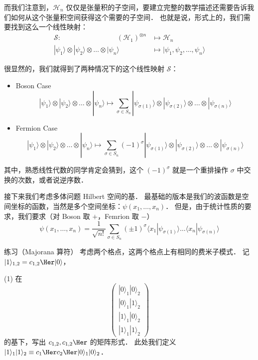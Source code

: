 而我们注意到，$\mathcal{H}_n$ 仅仅是张量积的子空间，要建立完整的数学描述还需要告诉我们如何从这个张量积空间获得这个需要的子空间． 也就是说，形式上的，我们需要找到这么一个线性映射：
\begin{align}
\mathcal{S}:\quad\quad\quad\quad\quad\quad\quad\quad (\mathcal{H}_1)^{\otimes n}&\mapsto\mathcal{H}_n\\
|\psi_1\rangle\otimes|\psi_2\rangle\otimes\dots\otimes|\psi_n\rangle &\mapsto|\psi_1,\psi_2,\dots,\psi_n\rangle
\end{align}

很显然的，我们就得到了两种情况下的这个线性映射 $\mathcal{S}$：
\begin{itemize}
\item Boson Case
\begin{equation}
|\psi_1\rangle\otimes|\psi_2\rangle\otimes\dots\otimes|\psi_n\rangle \mapsto \sum_{{\sigma}\in S_n}|\psi_{\sigma(1)}\rangle\otimes|\psi_{\sigma(2)}\rangle\otimes\dots\otimes|\psi_{\sigma(n)}\rangle
\end{equation}
\item Fermion Case
\begin{equation}
|\psi_1\rangle\otimes|\psi_2\rangle\otimes\dots\otimes|\psi_n\rangle \mapsto \sum_{{\sigma}\in S_n}(-1)^{\sigma}|\psi_{\sigma(1)}\rangle\otimes|\psi_{\sigma(2)}\rangle\otimes\dots\otimes|\psi_{\sigma(n)}\rangle
\end{equation}
\end{itemize}

其中，熟悉线性代数的同学肯定会猜到，这个 $(-1)^{\sigma}$ 就是一个重排操作 $\sigma$ 中交换的次数，或者说逆序数．

接下来我们考虑多体问题 Hilbert 空间的基． 最基础的版本是我们的波函数是空间坐标的函数，当然是多个空间坐标：$\psi(x_1,\dots,x_n)$． 但是，由于统计性质的要求，我们要求（对 Boson 取 $+$，Femrion 取 $-$）
\begin{equation}
\psi(x_1,\dots,x_n)=\frac{1}{\sqrt{n!}}\sum_{\sigma\in S_n}(\pm1)^\sigma\langle x_1|\psi_{\sigma(1)}\rangle\dots\langle x_n|\psi_{\sigma(n)}\rangle
\end{equation}

\begin{exercise}{练习（Majorana 算符）}
考虑两个格点，这两个格点上有相同的费米子模式． 记 $|1\rangle_{1,2}=c_{1,2}\Her|0\rangle$，

(1) 在
\begin{equation}
\left(\begin{matrix}|0\rangle_1|0\rangle_2\\|0\rangle_1|1\rangle_2\\|1\rangle_1|0\rangle_2\\|1\rangle_1|1\rangle_2\end{matrix}\right) 
\end{equation}
的基下，写出 $c_{1,2}, c_{1,2}\Her$ 的矩阵形式． 此处我们定义 $|1\rangle_1|1\rangle_2\equiv c_1\Her c_2\Her|0\rangle_1|0\rangle_2$．
\end{exercise}